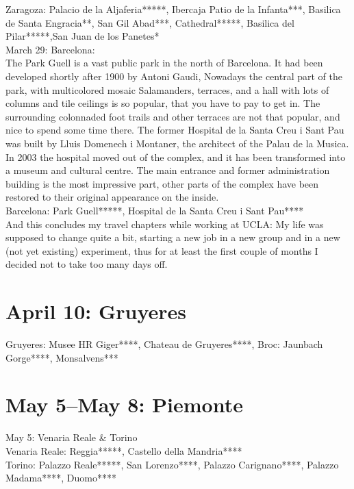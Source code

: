 Zaragoza: Palacio de la Aljaferia*****, Ibercaja Patio de la Infanta***, Basilica de Santa Engracia**, San Gil Abad***, Cathedral*****, Basilica del Pilar*****,San Juan de los Panetes*\\

March 29: Barcelona:\\
The Park Guell is a vast public park in the north of Barcelona. It had been developed shortly after 1900 by Antoni Gaudi, Nowadays the central part of the park, with multicolored mosaic Salamanders, terraces, and a hall with lots of columns and tile ceilings is so popular, that you have to pay to get in. The surrounding colonnaded foot trails and other terraces are not that popular, and nice to spend some time there. The former Hospital de la Santa Creu i Sant Pau was built by Lluis Domenech i Montaner, the architect of the Palau de la Musica. In 2003 the hospital moved out of the complex, and it has been transformed into a museum and cultural centre. The main entrance and former administration building is the most impressive part, other parts of the complex have been restored to their original appearance on the inside.\\

Barcelona: Park Guell*****, Hospital de la Santa Creu i Sant Pau****\\

And this concludes my travel chapters while working at UCLA: My life was supposed to change quite a bit, starting a new job in a new group and in a new (not yet existing) experiment, thus for at least the first couple of months I decided not to take too many days off.\\

\section{April 10: Gruyeres}
\label{2016Gruyeres}

Gruyeres: Musee HR Giger****, Chateau de Gruyeres****, Broc: Jaunbach Gorge****, Monsalvens***

\section{May 5--May 8: Piemonte}

May 5: Venaria Reale \& Torino\\
Venaria Reale: Reggia*****, Castello della Mandria****\\
Torino: Palazzo Reale*****, San Lorenzo****, Palazzo Carignano****, Palazzo Madama****, Duomo****\\

